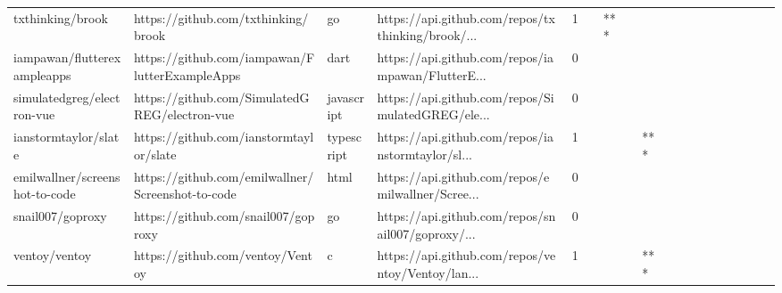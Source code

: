 \begin{tabular}{llllrlllllllllllll}
txthinking/brook                                   &                https://github.com/txthinking/brook &                go &  https://api.github.com/repos/txthinking/brook/... &       1 &         &    *** &           &                &                 &        &           &           &          &          &       &              &          \\
iampawan/flutterexampleapps                        &     https://github.com/iampawan/FlutterExampleApps &              dart &  https://api.github.com/repos/iampawan/FlutterE... &       0 &         &        &           &                &                 &        &           &           &          &          &       &              &          \\
simulatedgreg/electron-vue                         &      https://github.com/SimulatedGREG/electron-vue &        javascript &  https://api.github.com/repos/SimulatedGREG/ele... &       0 &         &        &           &                &                 &        &           &           &          &          &       &              &          \\
ianstormtaylor/slate                               &            https://github.com/ianstormtaylor/slate &        typescript &  https://api.github.com/repos/ianstormtaylor/sl... &       1 &         &        &           &            *** &                 &        &           &           &          &          &       &              &          \\
emilwallner/screenshot-to-code                     &  https://github.com/emilwallner/Screenshot-to-code &              html &  https://api.github.com/repos/emilwallner/Scree... &       0 &         &        &           &                &                 &        &           &           &          &          &       &              &          \\
snail007/goproxy                                   &                https://github.com/snail007/goproxy &                go &  https://api.github.com/repos/snail007/goproxy/... &       0 &         &        &           &                &                 &        &           &           &          &          &       &              &          \\
ventoy/ventoy                                      &                   https://github.com/ventoy/Ventoy &                 c &  https://api.github.com/repos/ventoy/Ventoy/lan... &       1 &         &        &           &            *** &                 &        &           &           &          &          &       &              &          \\

\end{tabular}
